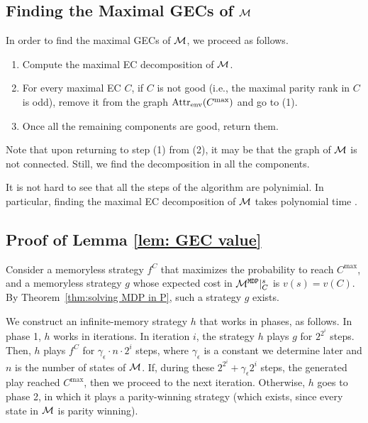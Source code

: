 \documentclass[runningheads,a4paper]{llncs}
\newcommand{\M}{{\cal M}}
\newcommand{\MDP}{{\mathtt{MDP}}}
\newcommand{\gecs}{{GECs}\xspace}
\newcommand{\attr}{{\rm Attr}}
\newcommand{\env}{{\rm env}}
\begin{document}
\subsection{Finding the Maximal \gecs of $\M$}
\label{app inf memory finding gecs}

In order to find the maximal \gecs of $\M$, we proceed as follows. 
\begin{enumerate}
\item Compute the maximal EC decomposition of $\M$.
\item For every maximal EC $C$, if $C$ is not good (i.e., the maximal parity rank in $C$ is odd), remove it from the graph $\attr_{\env}(C^{\max})$ and go to (1).
\item Once all the remaining components are good, return them.
\end{enumerate}
Note that upon returning to step (1) from (2), it may be that the graph of $\M$ is not connected. Still, we find the decomposition in all the components.

It is not hard to see that all the steps of the algorithm are polynimial. In particular, finding the maximal EC decomposition of $\M$ takes polynomial time \cite{CH14}.

\subsection{Proof of Lemma \ref{lem: GEC value}}

Consider a memoryless strategy $f^C$ that maximizes the probability to reach $C^{\max}$, and a memoryless strategy $g$ whose expected cost in $\M^{\MDP}|_C^s$ is $v(s)=v(C)$. By Theorem~\ref{thm:solving MDP in P}, such a strategy $g$ exists.

We construct an infinite-memory strategy $h$ that works in phases, as follows. In phase 1, $h$ works in iterations. In iteration $i$, the strategy $h$ plays $g$ for $2^{2^i}$ steps. Then, $h$ plays $f^C$ for $\gamma_\epsilon \cdot n\cdot 2^i$ steps, where $\gamma_\epsilon$ is a constant we determine later and $n$ is the number of states of $\M$. If, during these $2^{2^i}+\gamma_\epsilon 2^i$ steps, the generated play reached $C^{\max}$, then we proceed to the next iteration. Otherwise, $h$ goes to phase 2, in which it plays a parity-winning strategy (which exists, since every state in $\M$ is parity winning).
\end{document}
